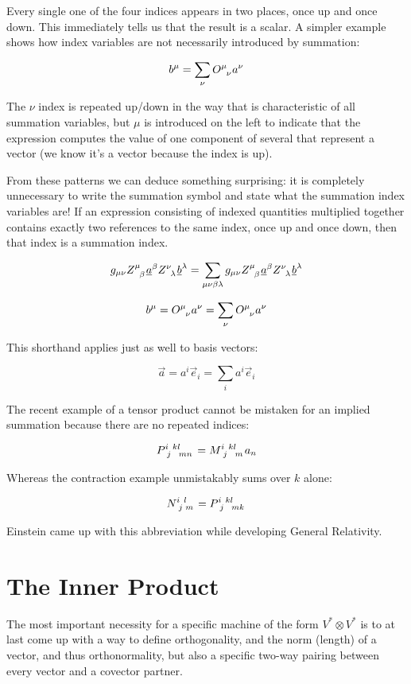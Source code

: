 Every single one of the four indices appears in two places, once up and once down. This immediately tells us that the result is a scalar. A simpler example shows how index variables are not necessarily introduced by summation:

$$
b^\mu = \sum_{\nu} O\indices{^\mu_\nu} a^\nu
$$

The $\nu$ index is repeated up/down in the way that is characteristic of all summation variables, but $\mu$ is introduced on the left to indicate that the expression computes the value of one component of several that represent a vector (we know it's a vector because the index is up).

From these patterns we can deduce something surprising: it is completely unnecessary to write the summation symbol and state what the summation index variables are! If an expression consisting of indexed quantities multiplied together contains exactly two references to the same index, once up and once down, then that index is a summation index.

$$
g_{\mu\nu} Z\indices{^\mu_\beta} \underline{a}^{\beta} Z\indices{^\nu_\lambda} \underline{b}^{\lambda}
=
\sum_{\mu\nu\beta\lambda} g_{\mu\nu} Z\indices{^\mu_\beta} \underline{a}^{\beta} Z\indices{^\nu_\lambda} \underline{b}^{\lambda}
$$

$$
b^\mu = O\indices{^\mu_\nu} a^\nu = \sum_{\nu} O\indices{^\mu_\nu} a^\nu
$$

This shorthand applies just as well to basis vectors:

$$
\vec{a} = a^i \vec{e}_i = \sum_{i} a^i \vec{e}_i
$$

The recent example of a tensor product cannot be mistaken for an implied summation because there are no repeated indices:

$$
P\indices{^i_j^k^l_m_n} = M\indices{^i_j^k^l_m} a_n
$$
 
Whereas the contraction example unmistakably sums over $k$ alone:

$$
N\indices{^i_j^l_m} = P\indices{^i_j^k^l_m_k}
$$

Einstein came up with this abbreviation while developing General Relativity.

\section{The Inner Product} \label{inner-product}

The most important necessity for a specific machine of the form $V^* \otimes V^*$ is to at last come up with a way to define orthogonality, and the norm (length) of a vector, and thus orthonormality, but also a specific two-way pairing between every vector and a covector partner.

